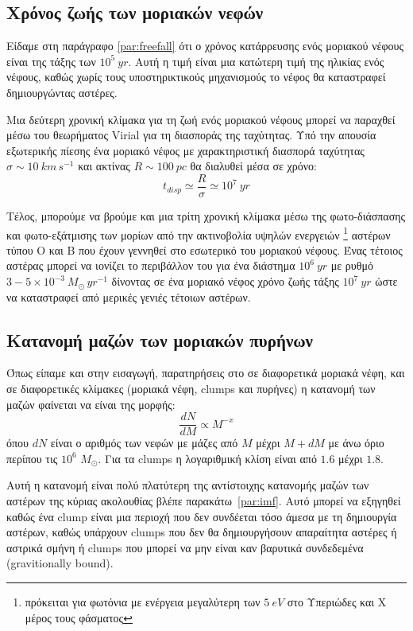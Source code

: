 \documentclass[a4paper,12pt]{memoir}
\newcommand{\sm}{$M_{\odot}$}
\begin{document}
\subsection{Χρόνος ζωής των μοριακών νεφών}
Είδαμε στη παράγραφο \ref{par:freefall} ότι ο χρόνος κατάρρευσης ενός μοριακού νέφους είναι της τάξης των $10^5 \ yr$. Αυτή η τιμή είναι μια κατώτερη τιμή της ηλικίας ενός νέφους, καθώς χωρίς τους υποστηρικτικούς μηχανισμούς το νέφος θα καταστραφεί δημιουργώντας αστέρες.

Μια δεύτερη χρονική κλίμακα για τη ζωή ενός μοριακού νέφους μπορεί να παραχθεί μέσω του θεωρήματος Virial για τη διασποράς της ταχύτητας. Υπό την απουσία εξωτερικής πίεσης ένα μοριακό νέφος με χαρακτηριστική διασπορά ταχύτητας $\sigma \sim 10 \ km \, s^{-1}$ και ακτίνας $R \sim 100 \ pc$ θα διαλυθεί μέσα σε χρόνο:
\begin{equation}
t_{disp} \simeq \frac{R}{\sigma} \simeq 10^7 \ yr
\end{equation} 

Τέλος, μπορούμε να βρούμε και μια τρίτη χρονική κλίμακα μέσω της φωτο-διάσπασης και φωτο-εξάτμισης των μορίων από την ακτινοβολία υψηλών ενεργειών \footnote{πρόκειται για φωτόνια με ενέργεια μεγαλύτερη των $5 \ eV$ στο Υπεριώδες και X μέρος τους φάσματος} αστέρων τύπου O και B που έχουν γεννηθεί στο εσωτερικό του μοριακού νέφους. Ένας τέτοιος αστέρας μπορεί να ιονίζει το περιβάλλον του για ένα διάστημα $10^6 \ yr$ με ρυθμό $3-5 \times 10^{-3} \ M_{\odot} \, yr^{-1}$ δίνοντας σε ένα μοριακό νέφος χρόνο ζωής τάξης $10^7 \ yr$ ώστε να καταστραφεί από μερικές γενιές τέτοιων αστέρων.



\subsection{Κατανομή μαζών των μοριακών πυρήνων} 
Όπως είπαμε και στην εισαγωγή, παρατηρήσεις στο  σε διαφορετικά μοριακά νέφη, και σε διαφορετικές κλίμακες (μοριακά νέφη, clumps και πυρήνες) η κατανομή των μαζών φαίνεται να είναι της μορφής:
\begin{equation}
\frac{dN}{dM} \propto M^{-x}
\end{equation}
όπου $dN$ είναι ο αριθμός των νεφών με μάζες από $M$ μέχρι $M+dM$ με άνω όριο περίπου τις $10^6$ \sm. Για τα clumps η λογαριθμική κλίση είναι από $1.6$ μέχρι $1.8$.

Αυτή η κατανομή είναι πολύ πλατύτερη της αντίστοιχης κατανομής μαζών των αστέρων της κύριας ακολουθίας βλέπε παρακάτω~\ref{par:imf}. Αυτό μπορεί να εξηγηθεί καθώς ένα clump είναι μια περιοχή που δεν συνδέεται τόσο άμεσα με τη δημιουργία αστέρων, καθώς υπάρχουν clumps που δεν θα δημιουργήσουν απαραίτητα αστέρες ή αστρικά σμήνη ή clumps που μπορεί να μην είναι καν βαρυτικά συνδεδεμένα (gravitionally bound).
\end{document}
